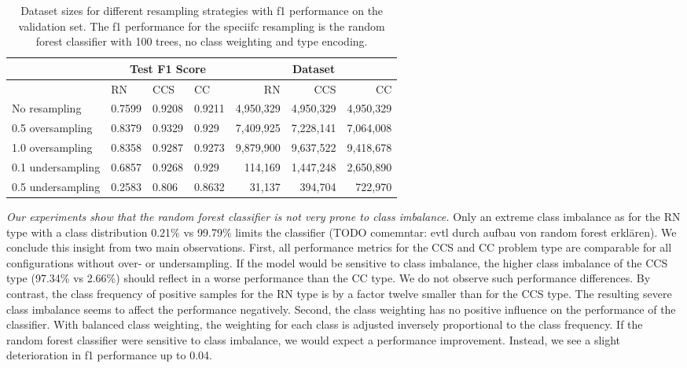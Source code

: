 \begin{table}[]
\tabcolsep=0.11cm
\begin{tabularx}{\textwidth}{lXXX|rrr}
\toprule
                    & \multicolumn{3}{c}{Test F1 Score} & \multicolumn{3}{c}{Dataset}   \\ \midrule
                    & RN        & CCS        & CC     & RN            & CCS         & CC          \\ \midrule
No resampling     &  0.7599   &  0.9208    &  0.9211  &  4,950,329    & 4,950,329   & 4,950,329   \\
0.5 oversampling  &  0.8379   &  0.9329    &  0.929   &  7,409,925    & 7,228,141   & 7,064,008   \\
1.0 oversampling  &  0.8358   &  0.9287    &  0.9273  &  9,879,900    & 9,637,522   & 9,418,678   \\ \midrule
0.1 undersampling &  0.6857   &  0.9268    &  0.929   &  114,169      & 1,447,248   & 2,650,890   \\
0.5 undersampling &  0.2583   &  0.806     &  0.8632  &  31,137       & 394,704     & 722,970     \\ \bottomrule
\end{tabularx}
\caption[Dataset sizes for different resampling strategies and performance for random forest classifier]{Dataset sizes for different resampling strategies with f1 performance on the validation set. The f1 performance for the speciifc resampling is the random forest classifier with 100 trees, no class weighting and type encoding.}
\label{tab:resampling_size_performance_rf}
\end{table}

\textit{Our experiments show that the random forest classifier is not very prone to class imbalance.} Only an extreme class imbalance as for the RN type with a class distribution 0.21\% vs 99.79\% limits the classifier (TODO comemntar: evtl durch aufbau von random forest erklären). We conclude this insight from two main observations. 
First, all performance metrics for the CCS and CC problem type are comparable for all configurations without over- or undersampling. If the model would be sensitive to class imbalance, the higher class imbalance of the CCS type (97.34\% vs 2.66\%) should reflect in a worse performance than the CC type. We do not observe such performance differences. By contrast, the class frequency of positive samples for the RN type is by a factor twelve smaller than for the CCS type. The resulting severe class imbalance seems to affect the performance negatively. 
Second, the class weighting has no positive influence on the performance of the classifier. With balanced class weighting, the weighting for each class is adjusted inversely proportional to the class frequency. If the random forest classifier were sensitive to class imbalance, we would expect a performance improvement. Instead, we see a slight deterioration in f1 performance up to 0.04.


